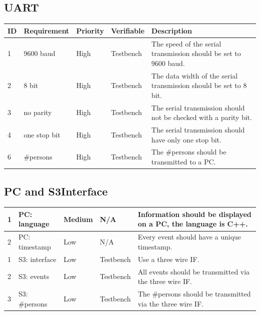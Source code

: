 \documentclass{article}
\begin{document}
\subsection{UART}
\begin{center}
    
\begin{tabular}{|p{1.5cm}|p{3.5cm}|p{1.5cm}|p{2cm}|p{5.5cm}|}
		\hline
		\textbf{ID} & \textbf{Requirement} & \textbf{Priority} & \textbf{Verifiable} & \textbf{Description} \\
		\hline
	
		\hline
		1 & 9600 baud & High &  Testbench & The speed of the serial transmission should be set to 9600 baud. \\
		\hline
		2 &  8 bit & High & Testbench & The data width of the serial transmission should be set to 8 bit. \\
		\hline
		3 &  no parity & High & Testbench & The serial transmission should not be checked with a parity bit. \\
		\hline
		4 &  one stop bit & High  & Testbench & The serial transmission should have only one stop bit. \\
		\hline
		6 &  \#persons & High &  Testbench &  The \#persons should be transmitted to a PC. \\
		\hline
		\end{tabular}
		\end{center}
		\newpage
		\subsection{PC and S3Interface}
		\begin{center}
	
		\begin{tabular}{|p{1.5cm}|p{3.5cm}|p{1.5cm}|p{2cm}|p{5.5cm}|}
			\hline
	
		\hline	
		1 & PC: language & Medium & N/A &  Information should be displayed on a PC, the language is C++. \\
		\hline
		2 & PC: timestamp & Low & N/A  & Every event should have a unique timestamp. \\
		\hline
	
		\hline
		1 & S3: interface & Low & Testbench & Use a three wire IF. \\
		\hline
		2 & S3: events & Low & Testbench & All events should be transmitted via the three wire IF. \\
		\hline
		3 & S3: \#persons & Low  & Testbench & The \#persons should be transmitted via the three wire IF. \\
		\hline
		\end{tabular}
		\end{center}
\newpage
\end{document}
